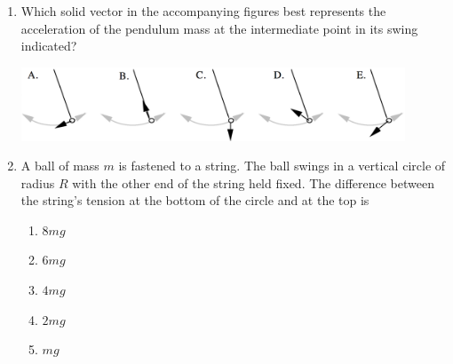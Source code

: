 \documentclass[12pt,letterpaper]{article}
\begin{document}
\begin{enumerate}[resume]
\item
Which solid vector in the accompanying figures best represents the acceleration of the pendulum mass at the intermediate point in its swing indicated?

\includegraphics[width=0.9\textwidth,center]{swing.png}


\item
A ball of mass $m$ is fastened to a string. The ball swings in a vertical circle of radius $R$ with the other end of the string held fixed. The difference between the string's tension at the bottom of the circle and at the top is
\begin{enumerate}
\item $8mg$
\item $6mg$
\item $4mg$
\item $2mg$
\item $mg$
\end{enumerate}


\end{enumerate}
\end{document}
